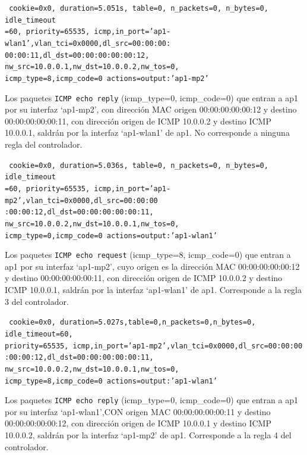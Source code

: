 \documentclass[a4paper,12pt,twoside,spanish]{book}
\begin{document}
\noindent\texttt{
	cookie=0x0, duration=5.051s, table=0, n\_packets=0, n\_bytes=0, idle\_timeout\\
	=60, priority=65535,
	icmp,in\_port='ap1-wlan1',vlan\_tci=0x0000,dl\_src=00:00:00:\\
	00:00:11,dl\_dst=00:00:00:00:00:12,
	nw\_src=10.0.0.1,nw\_dst=10.0.0.2,nw\_tos=0,\\
	icmp\_type=8,icmp\_code=0 actions=output:'ap1-mp2'
}

Los paquetes \texttt{ICMP echo reply} (icmp\_type=0, icmp\_code=0) que entran a ap1 por su interfaz ‘ap1-mp2’, con dirección MAC origen 00:00:00:00:00:12 y destino 00:00:00:00:00:11, con dirección origen de ICMP 10.0.0.2 y destino ICMP 10.0.0.1, saldrán por la interfaz ‘ap1-wlan1’ de ap1. No corresponde a ninguna regla del  controlador.\par 

\noindent\texttt{
	cookie=0x0, duration=5.036s, table=0, n\_packets=0, n\_bytes=0, idle\_timeout\\
	=60, priority=65535,
	icmp,in\_port='ap1-mp2',vlan\_tci=0x0000,dl\_src=00:00:00\\
	:00:00:12,dl\_dst=00:00:00:00:00:11,
	nw\_src=10.0.0.2,nw\_dst=10.0.0.1,nw\_tos=0,\\
	icmp\_type=0,icmp\_code=0 actions=output:'ap1-wlan1'
}

Los paquetes \texttt{ICMP echo request} (icmp\_type=8, icmp\_code=0) que entran a ap1 por su interfaz ‘ap1-mp2’, cuyo origen es la dirección MAC 00:00:00:00:00:12 y destino 00:00:00:00:00:11, con dirección origen de ICMP 10.0.0.2 y destino ICMP 10.0.0.1, saldrán por la interfaz ‘ap1-wlan1’ de ap1. Corresponde a la regla 3 del controlador.\par 

\noindent\texttt{
	cookie=0x0, duration=5.027s,table=0,n\_packets=0,n\_bytes=0, idle\_timeout=60,\\
	priority=65535,
	icmp,in\_port='ap1-mp2',vlan\_tci=0x0000,dl\_src=00:00:00\\
	:00:00:12,dl\_dst=00:00:00:00:00:11,
	nw\_src=10.0.0.2,nw\_dst=10.0.0.1,nw\_tos=0,\\
	icmp\_type=8,icmp\_code=0 actions=output:'ap1-wlan1'
}

Los paquetes \texttt{ICMP echo reply} (icmp\_type=0, icmp\_code=0) que entran a ap1 por su interfaz ‘ap1-wlan1’,CON origen MAC 00:00:00:00:00:11 y destino 00:00:00:00:00:12, con dirección origen de ICMP 10.0.0.1 y destino ICMP 10.0.0.2, saldrán por la interfaz ‘ap1-mp2’ de ap1. Corresponde a la regla 4 del controlador. \par 
\end{document}
